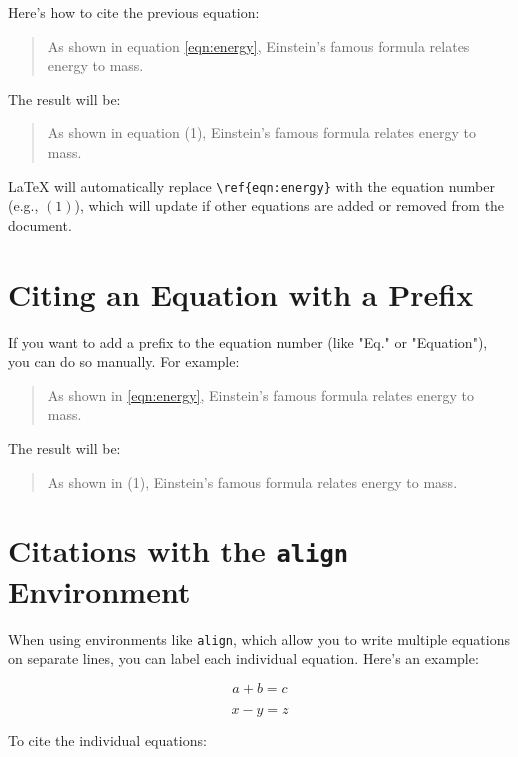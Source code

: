 Here’s how to cite the previous equation:

\begin{quote}
	As shown in equation \ref{eqn:energy}, Einstein’s famous formula relates energy to mass.
\end{quote}

The result will be:

\begin{quote}
	As shown in equation (1), Einstein’s famous formula relates energy to mass.
\end{quote}

LaTeX will automatically replace \verb|\ref{eqn:energy}| with the equation number (e.g., \((1)\)), which will update if other equations are added or removed from the document.

\section{Citing an Equation with a Prefix}

If you want to add a prefix to the equation number (like "Eq." or "Equation"), you can do so manually. For example:

\begin{quote}
	As shown in  \ref{eqn:energy}, Einstein’s famous formula relates energy to mass.
\end{quote}

The result will be:

\begin{quote}
	As shown in  (1), Einstein’s famous formula relates energy to mass.
\end{quote}

\section{Citations with the \texttt{align} Environment}

When using environments like \verb|align|, which allow you to write multiple equations on separate lines, you can label each individual equation. Here’s an example:

\begin{equation}
  a + b = c
  \label{eqn:sum}
\end{equation}

\begin{equation}
  x - y = z
  \label{eqn:diff}
\end{equation}

To cite the individual equations:


